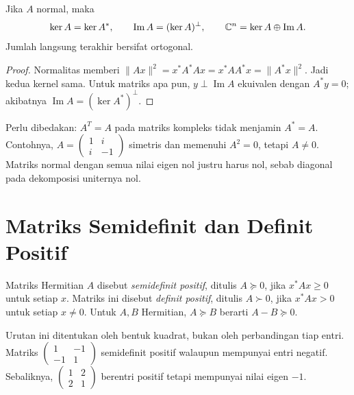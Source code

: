 \begin{prop}
    \label{khusus:kernel-normal}
    Jika $A$ normal, maka
    \[
        \ker A=\ker A^*,\qquad
        \operatorname{Im}A=(\ker A)^\perp,\qquad
        \mathbb{C}^n=\ker A\oplus\operatorname{Im}A.
    \]
    Jumlah langsung terakhir bersifat ortogonal.
\end{prop}
\begin{proof}
    Normalitas memberi
    $\|Ax\|^2=x^*A^*Ax=x^*AA^*x=\|A^*x\|^2$.
    Jadi kedua kernel sama. Untuk matriks apa pun,
    $y\perp\operatorname{Im}A$ ekuivalen dengan $A^*y=0$;
    akibatnya $\operatorname{Im}A=(\ker A^*)^\perp$.
\end{proof}

Perlu dibedakan: $A^T=A$ pada matriks kompleks tidak menjamin
$A^*=A$. Contohnya,
$A=\begin{pmatrix}1&i\\i&-1\end{pmatrix}$ simetris dan memenuhi
$A^2=0$, tetapi $A\ne0$. Matriks normal dengan semua nilai eigen nol
justru harus nol, sebab diagonal pada dekomposisi uniternya nol.

\section{Matriks Semidefinit dan Definit Positif}
\label{khusus:positif}

\begin{definisi}
    Matriks Hermitian $A$ disebut \emph{semidefinit positif}, ditulis
    $A\succeq0$, jika $x^*Ax\ge0$ untuk setiap $x$.
    Matriks ini disebut \emph{definit positif}, ditulis $A\succ0$,
    jika $x^*Ax>0$ untuk setiap $x\ne0$.
    Untuk $A,B$ Hermitian, $A\succeq B$ berarti $A-B\succeq0$.
\end{definisi}

Urutan ini ditentukan oleh bentuk kuadrat, bukan oleh perbandingan
tiap entri. Matriks $\begin{pmatrix}1&-1\\-1&1\end{pmatrix}$
semidefinit positif walaupun mempunyai entri negatif. Sebaliknya,
$\begin{pmatrix}1&2\\2&1\end{pmatrix}$ berentri positif tetapi
mempunyai nilai eigen $-1$.

